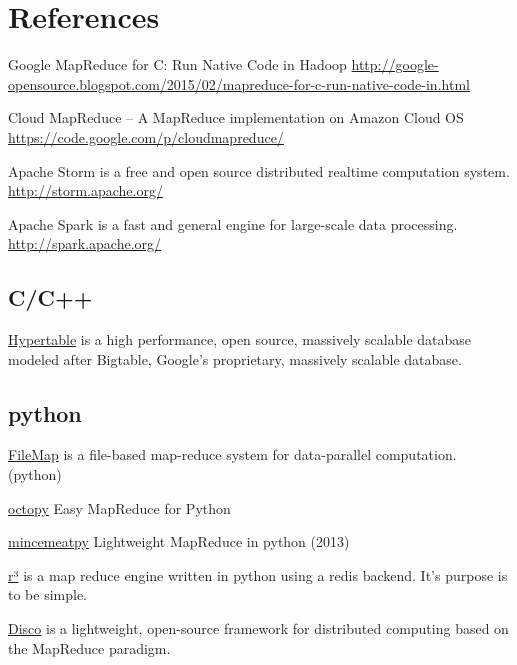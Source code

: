 \documentclass[letter,11pt,onecolumn]{book}
\title{\doctitle}
\author{\docauthor}
\begin{document}
\maketitle
\tableofcontents


%

\appendix

\chapter{References}

Google MapReduce for C: Run Native Code in Hadoop
\url{http://google-opensource.blogspot.com/2015/02/mapreduce-for-c-run-native-code-in.html}



Cloud MapReduce -- A MapReduce implementation on Amazon Cloud OS
\url{https://code.google.com/p/cloudmapreduce/}


Apache Storm is a free and open source distributed realtime computation system.
\url{http://storm.apache.org/}

Apache Spark is a fast and general engine for large-scale data processing.
\url{http://spark.apache.org/}


\section{C/C++}


\href{http://hypertable.com/}{Hypertable} is a high performance, open source, massively scalable database modeled after Bigtable, Google's proprietary, massively scalable database.

\section{python}


\href{https://github.com/mfisk/filemap.git}{FileMap} is a file-based map-reduce system for data-parallel computation. (python)

\href{https://code.google.com/p/octopy/}{octopy} Easy MapReduce for Python

\href{https://github.com/michaelfairley/mincemeatpy.git}{mincemeatpy} Lightweight MapReduce in python (2013)

\href{http://heynemann.github.io/r3/}{r³} is a map reduce engine written in python using a redis backend. It's purpose is to be simple.


\href{http://discoproject.org/}{Disco} is a lightweight, open-source framework for distributed computing based on the MapReduce paradigm.
\end{document}

